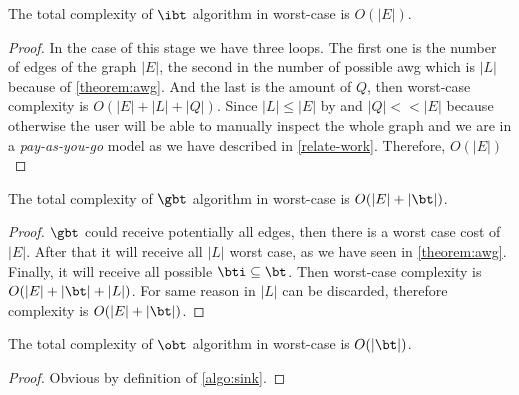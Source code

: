 \begin{proposition}\label{prop:comp-src}
The total complexity of $\ibt$ algorithm in worst-case is $O(|E|)$.
\end{proposition}
\begin{proof}
In the case of this stage we have three loops. The first one is the number of edges of the graph $|E|$, the second in the number 
of possible \acrshort{awg} which is $|L|$ because of \autoref{theorem:awg}.
And the last is the amount of $Q$, then worst-case complexity is $O(|E| + |L| + |Q|)$.
Since $|L| \leq |E|$ by  and $|Q| << |E|$ because otherwise the user will be able to manually inspect the whole graph and we are in a \emph{pay-as-you-go} model
as we have described in \autoref{relate-work}.
Therefore, $O(|E|)$ 
\end{proof}

\begin{proposition}
The total complexity of $\gbt$ algorithm in worst-case is $O(|E| + |\bt|)$.
\end{proposition}
\begin{proof}
$\gbt$ could receive potentially all edges, then there is a worst case cost of $|E|$.
After that it will receive all $|L|$ worst case, as we have seen in \autoref{theorem:awg}.
Finally, it will receive all possible $\bti \subseteq \bt$. Then worst-case complexity is $O(|E| + |\bt| + |L|)$.
For same reason in  $|L|$ can be discarded, therefore complexity is $O(|E| + |\bt|)$.
\end{proof}

\begin{proposition}
The total complexity of $\obt$ algorithm in worst-case is $O(|\bt|)$.
\end{proposition}
\begin{proof}
Obvious by definition of \autoref{algo:sink}.
\end{proof}


